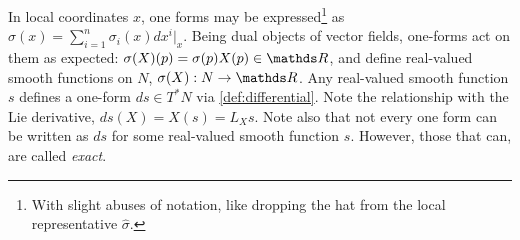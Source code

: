 {In local coordinates $x$, one forms may be expressed\footnote{With slight abuses of notation, like dropping the hat from the local representative $\hat \sigma$.} as $\sigma(x) = \sum_{i=1}^n \sigma_i(x)dx^i\vert_{x}$. Being dual objects of vector fields, one-forms act on them as expected: $\sigma(X)(p) = \sigma(p)X(p) \in \R$, and define real-valued smooth functions on $N$, $\sigma(X) : N \rightarrow \R$. Any real-valued smooth function $s$ defines a one-form $ds\in T^*N$ via \eqref{def:differential}. Note the relationship with the Lie derivative, $ds(X) = X(s) = L_Xs$. Note also that not every one form can be written as $ds$ for some real-valued smooth function $s$. However, those that can, are called \textit{exact}. 






}

